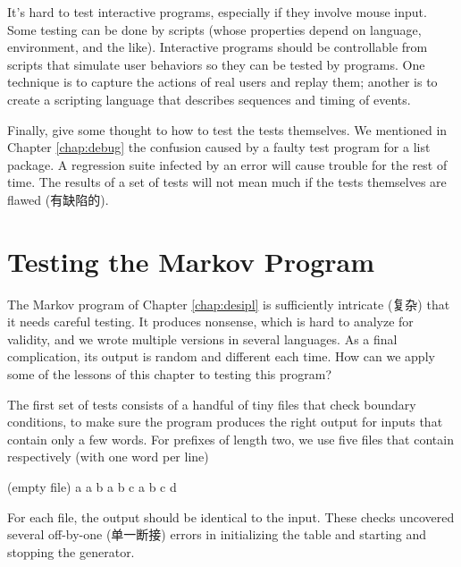 It's hard to test interactive programs, especially if they involve mouse
input.  Some testing can be done by scripts (whose properties depend on
language, environment, and the like). Interactive programs should be
controllable from scripts that simulate user behaviors so they can be
tested by programs. One technique is to capture the actions of real users
and replay them; another is to create a scripting language that describes
sequences and timing of events.

Finally, give some thought to how to test the tests themselves. We
mentioned in Chapter \ref{chap:debug} the confusion caused by a faulty test
program for a list package.  A regression suite infected by an error will
cause trouble for the rest of time.  The results of a set of tests will not
mean much if the tests themselves are flawed (有缺陷的).

\section{Testing the Markov Program}
\label{sec:testing_the_markov_program}

The Markov program of Chapter \ref{chap:desipl} is sufficiently intricate
(复杂) that it needs careful testing. It produces nonsense, which is hard
to analyze for validity, and we wrote multiple versions in several
languages. As a final complication, its output is random and different each
time. How can we apply some of the lessons of this chapter to testing this
program?

The first set of tests consists of a handful of tiny files that check
boundary conditions, to make sure the program produces the right output for
inputs that contain only a few words. For prefixes of length two, we use
five files that contain respectively (with one word per line)
\begin{wellcode}
    (empty file)
    a
    a b
    a b c
    a b c d
\end{wellcode}
For each file, the output should be identical to the input. These checks
uncovered several off-by-one (单一断接) errors in initializing the table
and starting and stopping the generator.

